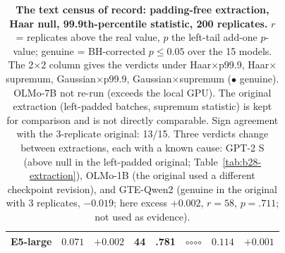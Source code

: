 \begin{table}[H]
\begin{tabular}{lccccc|cc}
E5-large & $0.071$ & $+0.002$ & 44 & .781 & $\circ$$\circ$$\circ$$\circ$ & $0.114$ & $+0.001$ \\
\bottomrule
\end{tabular}
\caption{\textbf{The text census of record: padding-free extraction, Haar null, 99.9th-percentile statistic, 200 replicates.} $r$ = replicates above the real value, $p$ the left-tail add-one $p$-value; genuine = BH-corrected $p\le0.05$ over the 15 models. The 2$\times$2 column gives the verdicts under Haar$\times$p99.9, Haar$\times$supremum, Gaussian$\times$p99.9, Gaussian$\times$supremum ($\bullet$ genuine). OLMo-7B not re-run (exceeds the local GPU). The original extraction (left-padded batches, supremum statistic) is kept for comparison and is not directly comparable. Sign agreement with the 3-replicate original: 13/15. Three verdicts change between extractions, each with a known cause: GPT-2 S (above null in the left-padded original; Table~\ref{tab:b28-extraction}), OLMo-1B (the original used a different checkpoint revision), and GTE-Qwen2 (genuine in the original with 3 replicates, $-0.019$; here excess $+0.002$, $r=58$, $p=.711$; not used as evidence).}
\label{tab:b23-text200}
\end{table}
